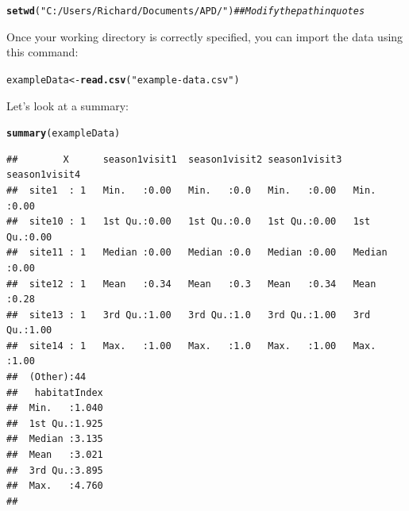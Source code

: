 \documentclass[12pt]{article}\usepackage[]{graphicx}\usepackage[]{color}
\makeatletter
\newcommand{\hlstr}[1]{\textcolor[rgb]{0.192,0.494,0.8}{#1}}%
\newcommand{\hlcom}[1]{\textcolor[rgb]{0.678,0.584,0.686}{\textit{#1}}}%
\newcommand{\hlstd}[1]{\textcolor[rgb]{0.345,0.345,0.345}{#1}}%
\newcommand{\hlkwb}[1]{\textcolor[rgb]{0.69,0.353,0.396}{#1}}%
\newcommand{\hlkwd}[1]{\textcolor[rgb]{0.737,0.353,0.396}{\textbf{#1}}}%
\newenvironment{kframe}{%
 \def\at@end@of@kframe{}%
 \ifinner\ifhmode%
  \def\at@end@of@kframe{\end{minipage}}%
  \begin{minipage}{\columnwidth}%
 \fi\fi%
 \def\FrameCommand##1{\hskip\@totalleftmargin \hskip-\fboxsep
 \colorbox{shadecolor}{##1}\hskip-\fboxsep
     \hskip-\linewidth \hskip-\@totalleftmargin \hskip\columnwidth}%
 \MakeFramed {\advance\hsize-\width
   \@totalleftmargin\z@ \linewidth\hsize
   \@setminipage}}%
 {\par\unskip\endMakeFramed%
 \at@end@of@kframe}
\newenvironment{knitrout}{}{} %
\makeatother
\begin{document}
\begin{knitrout}
\color{fgcolor}\begin{kframe}
\begin{alltt}
\hlkwd{setwd}\hlstd{(}\hlstr{"C:/Users/Richard/Documents/APD/"}\hlstd{)} \hlcom{## Modify the path in quotes}
\end{alltt}
\end{kframe}
\end{knitrout}

Once your working directory is correctly specified, you can import the data using this command:

\begin{knitrout}
\color{fgcolor}\begin{kframe}
\begin{alltt}
\hlstd{exampleData} \hlkwb{<-} \hlkwd{read.csv}\hlstd{(}\hlstr{"example-data.csv"}\hlstd{)}
\end{alltt}
\end{kframe}
\end{knitrout}

Let's look at a summary:

\begin{knitrout}\footnotesize
{}\color{fgcolor}\begin{kframe}
\begin{alltt}
\hlkwd{summary}\hlstd{(exampleData)}
\end{alltt}
\begin{verbatim}
##        X      season1visit1  season1visit2 season1visit3  season1visit4 
##  site1  : 1   Min.   :0.00   Min.   :0.0   Min.   :0.00   Min.   :0.00  
##  site10 : 1   1st Qu.:0.00   1st Qu.:0.0   1st Qu.:0.00   1st Qu.:0.00  
##  site11 : 1   Median :0.00   Median :0.0   Median :0.00   Median :0.00  
##  site12 : 1   Mean   :0.34   Mean   :0.3   Mean   :0.34   Mean   :0.28  
##  site13 : 1   3rd Qu.:1.00   3rd Qu.:1.0   3rd Qu.:1.00   3rd Qu.:1.00  
##  site14 : 1   Max.   :1.00   Max.   :1.0   Max.   :1.00   Max.   :1.00  
##  (Other):44                                                             
##   habitatIndex  
##  Min.   :1.040  
##  1st Qu.:1.925  
##  Median :3.135  
##  Mean   :3.021  
##  3rd Qu.:3.895  
##  Max.   :4.760  
## 
\end{verbatim}
\end{kframe}
\end{knitrout}
\end{document}
